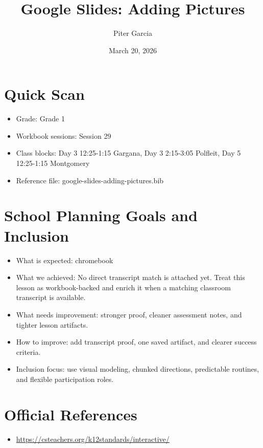 \documentclass[11pt]{article}
\title{Google Slides: Adding Pictures}
\author{Piter Garcia}
\date{March 20, 2026}
\begin{document}
\maketitle
\section*{Quick Scan}
\begin{itemize}[leftmargin=*]
\item Grade: Grade 1
\item Workbook sessions: Session 29
\item Class blocks: Day 3 12:25-1:15 Gargana, Day 3 2:15-3:05 Polfleit, Day 5 12:25-1:15 Montgomery
\item Reference file: google-slides-adding-pictures.bib
\end{itemize}
\section*{School Planning Goals and Inclusion}
\begin{itemize}[leftmargin=*]
\item What is expected: chromebook
\item What we achieved: No direct transcript match is attached yet. Treat this lesson as workbook-backed and enrich it when a matching classroom transcript is available.
\item What needs improvement: stronger proof, cleaner assessment notes, and tighter lesson artifacts.
\item How to improve: add transcript proof, one saved artifact, and clearer success criteria.
\item Inclusion focus: use visual modeling, chunked directions, predictable routines, and flexible participation roles.
\end{itemize}
\section*{Official References}
\begin{itemize}[leftmargin=*]
\item \url{https://csteachers.org/k12standards/interactive/}

\end{itemize}
\end{document}
